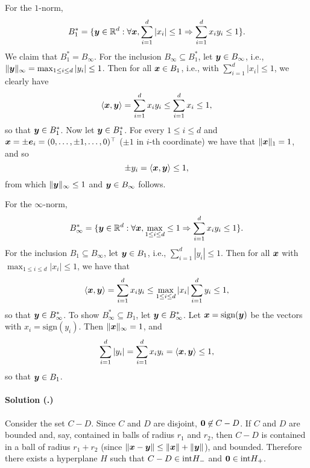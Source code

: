 \documentclass{article}
\newcounter{problemSheetNumber}
\newcounter{problems}
\renewcommand{\solution}[1]{\paragraph{Solution (\theproblemSheetNumber.\theproblems)}\addtocounter{problems}{1}\label{#1}}
\begin{document}
\begin{itemize}
For the $1$-norm, 
\begin{equation*}
 B_1^* = \{\bm{y}\in \mathbb{R}^d \mathrel{\mathop{:}} \forall \bm{x}, \sum_{i=1}^d |x_i|\leq 1\Rightarrow \sum_{i=1}^d x_i y_i\leq 1\}.
\end{equation*}
We claim that $B_1^*=B_{\infty}$. For the inclusion $B_\infty\subseteq B_1^*$, let $\bm{y}\in B_\infty$, i.e., $\Vert {\bm{y}}\Vert_\infty = \max_{1\leq i\leq d}|y_i|\leq 1$. Then for all $\bm{x}\in B_1$, i.e., with $\sum_{i=1}^d |x_i|\leq 1$, we clearly have 
\begin{equation*}
 \langle {\bm{x}}, {\bm{y}} \rangle = \sum_{i=1}^d x_iy_i\leq \sum_{i=1}^d x_i \leq 1,
\end{equation*}
so that $\bm{y}\in B_1^*$. Now let $\bm{y}\in B_1^*$. For every $1\leq i\leq d$ and $\bm{x}=\pm \bm{e}_i=(0,\dots,\pm 1,\dots,0)^{\top}$ ($\pm 1$ in $i$-th coordinate) we have that $\Vert {\bm{x}}\Vert_1=1$, and so 
\begin{equation*}
 \pm y_i = \langle {\bm{x}}, {\bm{y}} \rangle\leq 1, 
\end{equation*}
from which $\Vert {\bm{y}}\Vert_\infty\leq 1$ and $\bm{y}\in B_\infty$ follows.

For the $\infty$-norm,
\begin{equation*}
 B_\infty^* = \{\bm{y}\in \mathbb{R}^d \mathrel{\mathop{:}} \forall \bm{x}, \max_{1\leq i\leq d}\leq 1\Rightarrow \sum_{i=1}^d x_iy_i \leq 1\}.
\end{equation*}
For the inclusion $B_1\subseteq B_\infty$, let $\bm{y}\in B_1$, i.e., $\sum_{i=1}^d |y_i|\leq 1$. Then for all $\bm{x}$ with $\max_{1\leq i\leq d}|x_i|\leq 1$, we have that
\begin{equation*}
 \langle {\bm{x}}, {\bm{y}} \rangle = \sum_{i=1}^d x_iy_i\leq \max_{1\leq i\leq d}|x_i|\sum_{i=1}^d y_i \leq 1,
\end{equation*}
so that $\bm{y}\in B_\infty^*$. To show $B_\infty^*\subseteq B_1$, let $\bm{y}\in B_\infty^*$. Let $\bm{x}=\mathrm{sign}(\bm{y})$ be the vectors with $x_i = \mathrm{sign}(y_i)$. Then $\Vert {\bm{x}}\Vert_\infty = 1$, and
\begin{equation*}
 \sum_{i=1}^d |y_i| = \sum_{i=1}^d x_iy_i = \langle {\bm{x}}, {\bm{y}} \rangle \leq 1,
\end{equation*}
so that $\bm{y}\in B_1$.
\end{itemize}

\solution{pr:5} Consider the set $C-D$. Since $C$ and $D$ are disjoint, $\bm{0}\not\in C-D$. If $C$ and $D$ are bounded and, say, contained in balls of radius $r_1$ and $r_2$, then $C-D$ is contained in a ball of radius $r_1+r_2$ (since $\Vert {\bm{x}-\bm{y}}\Vert\leq \Vert {\bm{x}}\Vert+\Vert {\bm{y}}\Vert$), and bounded. Therefore there exists a hyperplane $H$ such that $C-D\in {\operatorname{int}} H_-$ and $\bm{0}\in {\operatorname{int}} H_+$.
\end{document}
